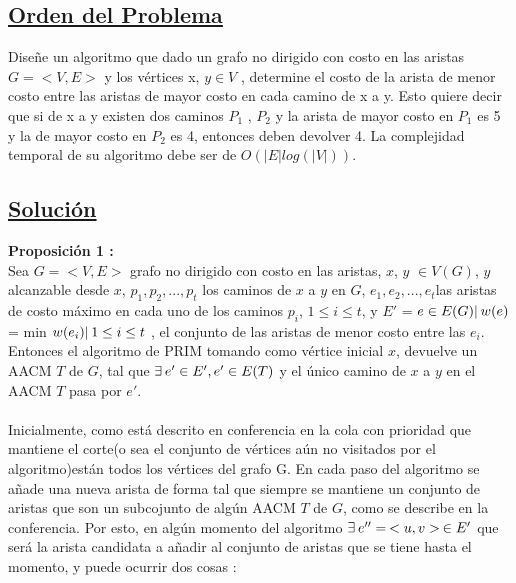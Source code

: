 \documentclass{article}
\begin{document}
    \subsection{\underline{Orden del Problema}}
    
    Dise\~ne un algoritmo que dado un grafo no dirigido con costo en las aristas $G = <V, E>$ y los v\'ertices x, $y \in  V$ ,
    determine el costo de la arista de menor costo entre las aristas de mayor costo en cada camino de x a y. Esto
    quiere decir que si de x a y existen dos caminos $P_1$ , $P_2$ y la arista de mayor costo en $P_1$ es 5 y la de mayor costo
    en $P_2$ es 4, entonces deben devolver 4. La complejidad temporal de su algoritmo debe ser de $O(|E|log(|V|))$.\\

    \subsection{\underline{Soluci\'on}}

    \noindent \textbf{Proposici\'on 1 :} \\
    
    Sea $G = <V,E>$ grafo no dirigido con costo en las aristas, $x$, $y$ $\in V(G)$, $y$ alcanzable desde $x$, \textbraceleft$p_1, p_2,..., p_t$\textbraceright 
    los caminos de $x$ a $y$ en $G$, \textbraceleft$e_1, e_2,..., e_t$\textbraceright las aristas de costo m\'aximo en cada uno de los caminos $p_i$, $1 \leq i \leq t$, y
    $E'$ = \textbraceleft $e \in E(G) |\hspace{0.2em} w(e)$ = min \textbraceleft $w(e_i) |\hspace{0.2em} 1 \leq i \leq t$ \textbraceright \textbraceright, el conjunto
    de las aristas de menor costo entre las $e_i$. Entonces el algoritmo de PRIM tomando como v\'ertice inicial $x$, devuelve un AACM $T$ de $G$, tal que $\exists\hspace{0.2em}
    e' \in E', e' \in E(T)$ y el \'unico camino de $x$ a $y$ en el AACM $T$ pasa por $e'$.\\\\
    
    Inicialmente, como est\'a descrito en conferencia en la cola con prioridad que mantiene el corte(o sea el conjunto de v\'ertices a\'un no visitados por el algoritmo)est\'an todos los 
    v\'ertices del grafo G. En cada paso del algoritmo se a\~nade una nueva arista de forma tal que siempre se mantiene un conjunto de aristas que son un subcojunto de alg\'un AACM $T$ de $G$,
    como se describe en la conferencia. Por esto, en alg\'un momento del algoritmo $\exists\hspace{0.2em} e'' = \hspace{0.2em}<u,v>\hspace{0.2em} \in E'$ que ser\'a la arista candidata a 
    a\~nadir al conjunto de aristas que se tiene hasta el momento, y puede ocurrir dos cosas :\\\\
    
\end{document}
